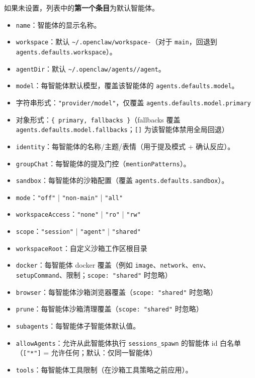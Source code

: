 如果未设置，列表中的\textbf{第一个条目}为默认智能体。
\begin{itemize}
  \item \texttt{name}：智能体的显示名称。
  \item \texttt{workspace}：默认 \texttt{\textasciitilde{}/.openclaw/workspace-}（对于 \texttt{main}，回退到 \texttt{agents.defaults.workspace}）。
  \item \texttt{agentDir}：默认 \texttt{\textasciitilde{}/.openclaw/agents//agent}。
  \item \texttt{model}：每智能体默认模型，覆盖该智能体的 \texttt{agents.defaults.model}。
  \item 字符串形式：\texttt{"provider/model"}，仅覆盖 \texttt{agents.defaults.model.primary}
  \item 对象形式：\texttt{\{ primary, fallbacks \}}（fallbacks 覆盖 \texttt{agents.defaults.model.fallbacks}；\texttt{[]} 为该智能体禁用全局回退）
  \item \texttt{identity}：每智能体的名称/主题/表情（用于提及模式 + 确认反应）。
  \item \texttt{groupChat}：每智能体的提及门控（\texttt{mentionPatterns}）。
  \item \texttt{sandbox}：每智能体的沙箱配置（覆盖 \texttt{agents.defaults.sandbox}）。
  \item \texttt{mode}：\texttt{"off"} | \texttt{"non-main"} | \texttt{"all"}
  \item \texttt{workspaceAccess}：\texttt{"none"} | \texttt{"ro"} | \texttt{"rw"}
  \item \texttt{scope}：\texttt{"session"} | \texttt{"agent"} | \texttt{"shared"}
  \item \texttt{workspaceRoot}：自定义沙箱工作区根目录
  \item \texttt{docker}：每智能体 docker 覆盖（例如 \texttt{image}、\texttt{network}、\texttt{env}、\texttt{setupCommand}、限制；\texttt{scope: "shared"} 时忽略）
  \item \texttt{browser}：每智能体沙箱浏览器覆盖（\texttt{scope: "shared"} 时忽略）
  \item \texttt{prune}：每智能体沙箱清理覆盖（\texttt{scope: "shared"} 时忽略）
  \item \texttt{subagents}：每智能体子智能体默认值。
  \item \texttt{allowAgents}：允许从此智能体执行 \texttt{sessions\_spawn} 的智能体 id 白名单（\texttt{["*"]} = 允许任何；默认：仅同一智能体）
  \item \texttt{tools}：每智能体工具限制（在沙箱工具策略之前应用）。

\end{itemize}
